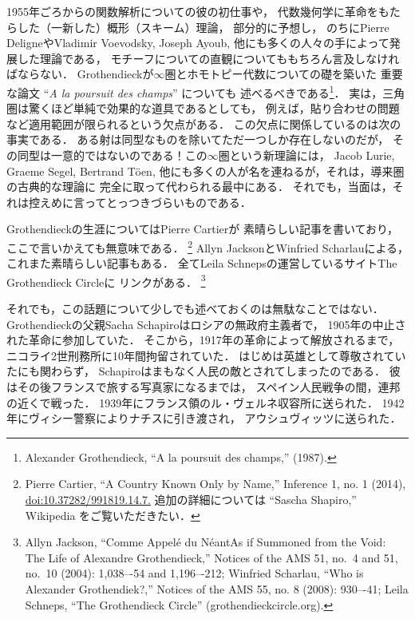 \documentclass[9pt, a4paper, dvipdfmx]{jlreq}
\theoremstyle{definition}
\theoremstyle{mystyle}
\numberwithin{equation}{section} %
\begin{document}
1955年ごろからの関数解析についての彼の初仕事や，
代数幾何学に革命をもたらした（一新した）概形（スキーム）理論，
部分的に予想し，
のちにPierre DeligneやVladimir Voevodsky, Joseph Ayoub, 
他にも多くの人々の手によって発展した理論である，
モチーフについての直観についてももちろん言及しなければならない．
Grothendieckが$\infty$圏とホモトピー代数についての礎を築いた
重要な論文 ``\textit{A la poursuit des champs}'' についても
述べるべきである\footnote[13]{
    Alexander Grothendieck, ``A la poursuit des champs,'' (1987).
}．
実は，三角圏は驚くほど単純で効果的な道具であるとしても，
例えば，貼り合わせの問題など適用範囲が限られるという欠点がある．
この欠点に関係しているのは次の事実である．
ある射は同型なものを除いてただ一つしか存在しないのだが，
その同型は一意的ではないのである！この$\infty$圏という新理論には，
Jacob Lurie, Graeme Segel, Bertrand T\"oen, 
他にも多くの人が名を連ねるが，それは，導来圏の古典的な理論に
完全に取って代わられる最中にある．
それでも，当面は，それは控えめに言ってとっつきづらいものである．



Grothendieckの生涯についてはPierre Cartierが
素晴らしい記事を書いており，ここで言いかえても無意味である．
\footnote[14]{
    Pierre Cartier, ``A Country Known Only by Name,'' 
    Inference 1, no. 1 (2014), \url{doi:10.37282/991819.14.7.} 
    追加の詳細については “Sascha Shapiro,” Wikipedia をご覧いただきたい．
}
Allyn JacksonとWinfried Scharlauによる，これまた素晴らしい記事もある．
全てLeila Schnepsの運営しているサイトThe Grothendieck Circleに
リンクがある．
\footnote[15]{
    Allyn Jackson, 
    ``Comme Appel\'e du N\'eant\text{---}As if 
    Summoned from the Void: 
    The Life of Alexandre Grothendieck,'' 
    Notices of the AMS 51, no.\ 4 and 51, no.\ 10 (2004): 
    1,038–-54 and 1,196–-212; 
    Winfried Scharlau, ``Who is Alexander Grothendiek?,'' 
    Notices of the AMS 55, no. 8 (2008): 930–-41; 
    Leila Schneps, ``The Grothendieck Circle'' 
    (grothendieckcircle.org).
}

それでも，この話題について少しでも述べておくのは無駄なことではない．
Grothendieckの父親Sacha Schapiroはロシアの無政府主義者で，
1905年の中止された革命に参加していた．
そこから，1917年の革命によって解放されるまで，
ニコライ2世刑務所に10年間拘留されていた．
はじめは英雄として尊敬されていたにも関わらず，
Schapiroはまもなく人民の敵とされてしまったのである．
彼はその後フランスで旅する写真家になるまでは，
スペイン人民戦争の間，連邦の近くで戦った．
1939年にフランス領のル・ヴェルネ収容所に送られた．
1942年にヴィシー警察によりナチスに引き渡され，
アウシュヴィッツに送られた．
\end{document}
